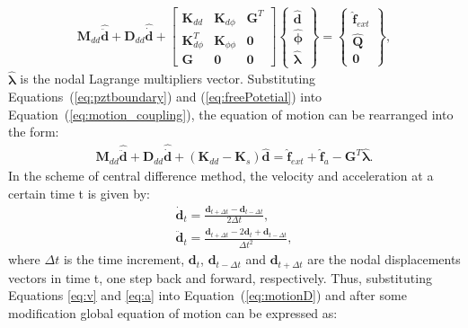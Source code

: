 \documentclass[11pt,a4paper,final]{report}
\begin{document}
\begin{eqnarray}
	\label{eq:motion_coupling}
	\textbf{M}_{dd} \widehat{\ddot{\textbf{d}}} +
	\textbf{D}_{dd}	\widehat{\dot{\textbf{d}}} +
	\left [\begin{array}{ccc}
		\textbf{K}_{dd}&\textbf{K}_{d\phi}&\textbf{G}^T\\
		\textbf{K}_{d\phi}^T&\textbf{K}_{\phi \phi}&\textbf{0}\\
		\textbf{G}&\textbf{0}&\textbf{0}
	\end{array}\right]
	\left \{\begin{array}{c}
		\widehat{\textbf{d}}\\
		\widehat{\boldsymbol{\phi}}\\
		\widehat{\boldsymbol{\lambda}}
	\end{array}\right\} =
	\left \{\begin{array}{c}
		\widehat{\textbf{f}}_{ext} \\
		\widehat{\textbf{Q}}\\
		\textbf{0}
	\end{array}\right \},
\end{eqnarray}
\(\widehat{\boldsymbol{\lambda}}\) is the nodal Lagrange multipliers vector.
Substituting Equations~(\ref{eq:pztboundary}) and (\ref{eq:freePotetial}) into Equation~(\ref{eq:motion_coupling}), the equation of motion can be rearranged into the form:
\begin{eqnarray}
	\textbf{M}_{dd} \widehat{\ddot{\textbf{d}}} + \textbf{D}_{dd} \widehat{\dot{\textbf{d}}} + (\textbf{K}_{dd}-\textbf{K}_{s}) \widehat{\textbf{d}}  = \widehat{\textbf{f}}_{ext} + \widehat{\textbf{f}}_{a} - \textbf{G}^T \widehat{\boldsymbol{\lambda}}.
	\label{eq:motionD}
\end{eqnarray}
In the scheme of central difference method, the velocity and acceleration at a certain time t is given by:
\begin{eqnarray}
	\label{eq:v}
	\dot{\textbf{d}}_{t} = \frac{\textbf{d}_{t+\Delta t} - \textbf{d}_{t-\Delta t}}{2\Delta t},\\
	\label{eq:a}
	\ddot{\textbf{d}}_{t} = \frac{\textbf{d}_{t+\Delta t} - 2\textbf{d}_{t} + \textbf{d}_{t-\Delta t}}{\Delta t^2},
\end{eqnarray}
where \(\Delta t\) is the time increment, \(\textbf{d}_{t}\), \(\textbf{d}_{t-\Delta t}\) and \(\textbf{d}_{t+\Delta t}\) are the nodal displacements vectors in time t, one step back and forward, respectively. 
Thus, substituting Equations \ref{eq:v} and \ref{eq:a} into Equation~(\ref{eq:motionD}) and after some modification global equation of motion can be expressed as:
\end{document}

